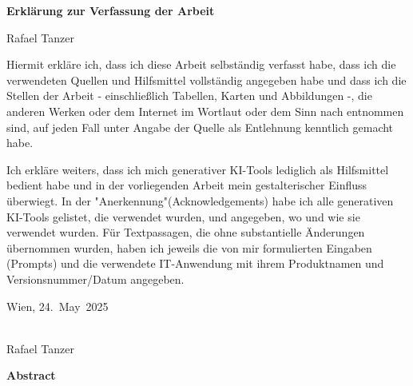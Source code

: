 \documentclass[11pt]{report}
\newcommand{\authorname}{Rafael Tanzer}
\newcommand{\submissionmonth}{May}
\newcommand{\submissionyear}{2025}
\newcommand{\submissionday}{24}
\begin{document}
\thispagestyle{empty}
\begin{flushright}
  {\LARGE\bfseries Erklärung zur Verfassung der Arbeit\par}
\end{flushright}

\vspace{4cm}
\noindent
{\large \authorname}

\vspace{2cm}

\noindent
Hiermit erkläre ich, dass ich diese Arbeit selbständig verfasst habe, dass ich die verwendeten Quellen und Hilfsmittel vollständig angegeben habe und dass ich die Stellen der Arbeit - einschließlich Tabellen, Karten und Abbildungen -, die anderen Werken oder dem Internet im Wortlaut oder dem Sinn nach entnommen sind, auf jeden Fall unter Angabe der Quelle als Entlehnung kenntlich gemacht habe.

\medskip

\noindent
Ich erkläre weiters, dass ich mich generativer KI-Tools lediglich als Hilfsmittel bedient habe und in der vorliegenden Arbeit mein gestalterischer Einfluss überwiegt. In der "Anerkennung"(Acknowledgements) habe ich alle generativen KI-Tools gelistet, die verwendet wurden, und angegeben, wo und wie sie verwendet wurden. Für Textpassagen, die ohne substantielle Änderungen übernommen wurden, haben ich jeweils die von mir formulierten Eingaben (Prompts) und die verwendete IT-Anwendung mit ihrem Produktnamen und Versionsnummer/Datum angegeben.

\vfill

\noindent
\begin{minipage}[t]{0.5\textwidth}
  Wien, \submissionday.~\submissionmonth~\submissionyear
\end{minipage}%
\hfill
\begin{minipage}[t]{0.4\textwidth}
  \hrulefill\\
  \centering \authorname
\end{minipage}

\cleardoublepage
\begin{flushright}
  {\Huge\bfseries Abstract\par}
\end{flushright}
\vspace*{3cm}
\end{document}
